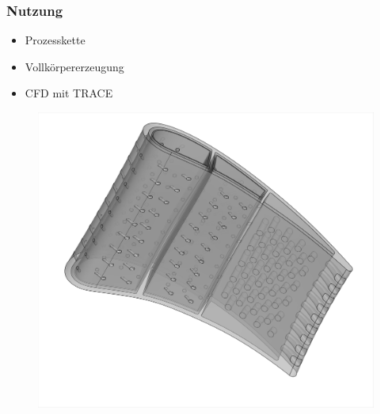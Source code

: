 \documentclass[8pt, aspectratio=169]{beamer}
\begin{document}
\begin{frame}
	\frametitle{Nutzung}
	\vspace{-1.5cm}\hspace{-0.5cm}
	\begin{minipage}[t]{0.38\textwidth}
		\vspace{-2cm}
		\begin{itemize}
			\item[\ding{109}] Prozesskette
			\item[\ding{109}] Vollkörpererzeugung
			\item[\ding{109}] CFD mit TRACE
		\end{itemize}
	\end{minipage}
	\begin{minipage}{0.6\textwidth}
		\begin{figure}[H]
			\centering
			\vspace{1cm}
			\includegraphics[width=\textwidth, trim={5px 5px 5px 5px}, clip]{../../assets/solid/surfaces2.png}
		\end{figure}
	\end{minipage}
	\vfill
\end{frame}
\end{document}
